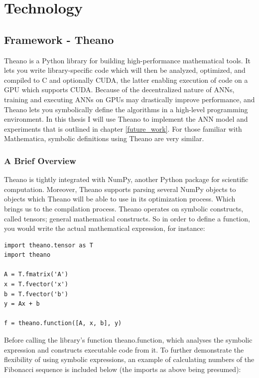 
\chapter{Technology}
\section{Framework - Theano}

Theano is a Python library for building high-performance mathematical tools. It lets you write library-specific code which will then be analyzed, optimized, and compiled to C and optionally CUDA, the latter enabling execution of code on a GPU which supports CUDA. Because of the decentralized nature of ANNs, training and executing ANNs on GPUs may drastically improve performance, and Theano lets you symbolically define the algorithms in a high-level programming environment. In this thesis I will use Theano to implement the ANN model and experiments that is outlined in chapter \ref{future_work}. For those familiar with Mathematica, symbolic definitions using Theano are very similar.

\subsection{A Brief Overview}

Theano is tightly integrated with NumPy, another Python package for scientific computation. Moreover, Theano supports parsing several NumPy objects to objects which Theano will be able to use in its optimization process. Which brings us to the compilation process.
Theano operates on symbolic constructs, called tensors; general mathematical constructs. So in order to define a function, you would write the actual mathematical expression, for instance:

\begin{verbatim}
import theano.tensor as T
import theano

A = T.fmatrix('A')
x = T.fvector('x')
b = T.fvector('b')
y = Ax + b

f = theano.function([A, x, b], y)
\end{verbatim}

Before calling the library's function theano.function, which analyses the symbolic expression and constructs executable code from it. To further demonstrate the flexibility of using symbolic expressions, an example of calculating numbers of the Fibonacci sequence is included below (the imports as above being presumed):

